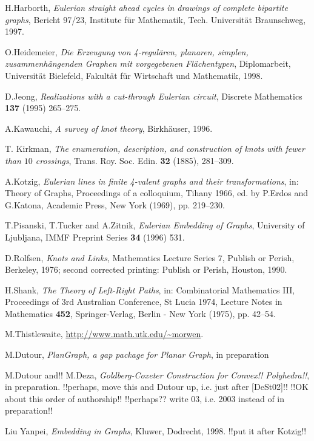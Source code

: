 \documentclass[12pt]{article}
\begin{document}
\begin{thebibliography}{99}
H.Harborth, {\em Eulerian straight ahead cycles in drawings of complete
bipartite graphs}, Bericht 97/23, Institute f\"{u}r Mathematik, Tech. 
Universit\"{a}t
Braunschweg, 1997.


O.Heidemeier, {\em Die Erzeugung von 4-regul\"{a}ren, planaren,
simplen, zusammenh\"{a}ngenden Graphen mit vorgegebenen Fl\"{a}chentypen},
Diplomarbeit, Universit\"{a}t Bielefeld, Fakult\"{a}t f\"{u}r Wirtschaft und
Mathematik, 1998. 

D.Jeong, {\em Realizations with a cut-through Eulerian circuit},
Discrete Mathematics {\bf 137} (1995) 265--275.



A.Kawauchi, {\em A survey of knot theory}, Birkh\"{a}user, 1996.


T. Kirkman, {\em The enumeration, description, and construction of knots with fewer than $10$ crossings}, Trans. Roy. Soc. Edin. {\bf 32} (1885), 281--309.


A.Kotzig, {\em Eulerian lines in finite 4-valent graphs and their 
transformations}, in: Theory of Graphs, Proceedings of a colloquium, 
Tihany 1966, ed. by P.Erdos and G.Katona, Academic Press, 
New York (1969), pp. 219--230.


T.Pisanski, T.Tucker and A.Zitnik, {\em Eulerian Embedding of Graphs},
University of Ljubljana, IMMF Preprint Series {\bf 34}
(1996) 531.


D.Rolfsen, {\em Knots and Links}, Mathematics Lecture Series 7, Publish or
Perish, Berkeley, 1976;
second corrected printing: Publish or Perish, Houston, 1990.


H.Shank, {\em The Theory of Left-Right Paths}, in: Combinatorial 
Mathematics III,
Proceedings of 3rd Australian Conference, St Lucia 1974, Lecture Notes in
Mathematics {\bf 452}, Springer-Verlag, Berlin - New York (1975),  pp. 42--54.


M.Thistlewaite, \url{http://www.math.utk.edu/~morwen}.


M.Dutour, {\em PlanGraph, a gap package for Planar Graph}, in preparation


M.Dutour and!! M.Deza, {\em Goldberg-Coxeter Construction for 
Convex!! Polyhedra!!}, in preparation.
!!perhaps, move this and Dutour up, i.e. just after [DeSt02]!!
!!OK about this order of authorship!!
!!perhaps?? write 03, i.e. 2003 instead of in preparation!!

Liu Yanpei, {\em Embedding in Graphs}, Kluwer, Dodrecht, 1998.
!!put it after Kotzig!!



 
\end{thebibliography}
\end{document}
